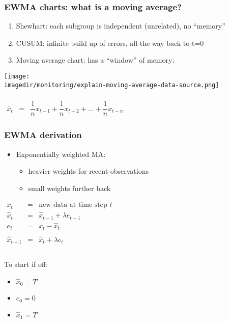 \begin{frame}\frametitle{EWMA charts: what is a moving average?}
	\begin{enumerate}
		\item	Shewhart: each subgroup is independent (unrelated), no ``memory'' 
		\item	CUSUM: infinite build up of errors, all the way back to t=0 
		\item	Moving average chart: has a ``window'' of memory: 
	\end{enumerate}
	
	\texttt{[image: \\imagedir/monitoring/explain-moving-average-data-source.png]}
	
	$ 
	\begin{array}{rcl}
		\\
		\bar{x}_t &=& \dfrac{1}{n}x_{t-1} + \dfrac{1}{n}x_{t-2} + \ldots + \dfrac{1}{n}x_{t-n} 
	\end{array}
	$
\end{frame}

\begin{frame}\frametitle{EWMA derivation}
	\begin{itemize}
		\item	Exponentially weighted MA: 
		\begin{itemize}
			\item	heavier weights for recent observations 
			\item	small weights further back 
		\end{itemize}
	\end{itemize}
	
	$ 
	\begin{array}{rcl}
		x_t &=& \text{new data at time step } t\\
		\hat{x}_t &=& \hat{x}_{t-1} + \lambda e_{t-1} \\
		e_t &=& x_t - \hat{x}_t \\
		\\
		\hat{x}_{t+1} &=& \hat{x}_{t} + \lambda e_{t} \\
		\\
	\end{array}
	$
	
	To start if off:
	\begin{itemize}
		\item	$\hat{x}_0 = T$ 
		\item	$e_0 = 0$ 
		\item	$\hat{x}_1 = T$ 
	\end{itemize}
\end{frame}

